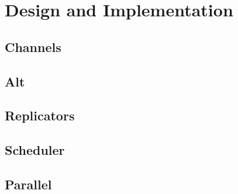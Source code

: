 

\chapter{Design and Implementation}
\label{ch:design_implementation}


\section{Channels}

\section{Alt}

\section{Replicators}

\section{Scheduler}

\section{Parallel}